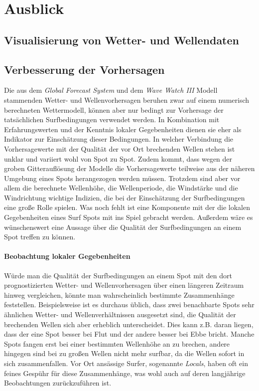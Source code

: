 \chapter{Ausblick}

\section{Visualisierung von Wetter- und Wellendaten}

\section{Verbesserung der Vorhersagen}
Die aus dem \textit{Global Forecast System} und dem \textit{Wave Watch
  III} Modell stammenden Wetter- und Wellenvorhersagen beruhen zwar
auf einem numerisch berechneten Wettermodell, können aber nur bedingt
zur Vorhersage der tatsächlichen Surfbedingungen verwendet werden. In
Kombination mit Erfahrungswerten und der Kenntnis lokaler
Gegebenheiten dienen sie eher als Indikator zur Einschätzung dieser
Bedingungen. In welcher Verbindung die Vorhersagewerte mit der
Qualität der vor Ort brechenden Wellen stehen ist unklar und variiert
wohl von Spot zu Spot. Zudem kommt, dass wegen der groben
Gitterauflösung der Modelle die Vorhersagewerte teilweise aus der
näheren Umgebung eines Spots herangezogen werden müssen. Trotzdem sind
aber vor allem die berechnete Wellenhöhe, die Wellenperiode, die
Windstärke und die Windrichtung wichtige Indizien, die bei der
Einschätzung der Surfbedingungen eine große Rolle spielen. Was noch
fehlt ist eine Komponente mit der die lokalen Gegebenheiten eines Surf
Spots mit ins Spiel gebracht werden. Außerdem wäre es wünschenswert
eine Aussage über die Qualität der Surfbedingungen an einem Spot
treffen zu können.

\subsubsection{Beobachtung lokaler Gegebenheiten}
Würde man die Qualität der Surfbedingungen an einem Spot mit den dort
prognostizierten Wetter- und Wellenvorhersagen über einen längeren
Zeitraum hinweg vergleichen, könnte man wahrscheinlich bestimmte
Zusammenhänge feststellen. Beispielsweise ist es durchaus üblich, dass
zwei benachbarte Spots sehr ähnlichen Wetter- und Wellenverhältnissen
ausgesetzt sind, die Qualität der brechenden Wellen sich aber
erheblich unterscheidet. Dies kann z.B. daran liegen, dass der eine
Spot besser bei Flut und der andere besser bei Ebbe bricht. Manche
Spots fangen erst bei einer bestimmten Wellenhöhe an zu brechen,
andere hingegen sind bei zu großen Wellen nicht mehr surfbar, da die
Wellen sofort in sich zusammenfallen. Vor Ort ansässige Surfer,
sogenannte \textit{Locals}, haben oft ein feines Gespühr für diese
Zusammenhänge, was wohl auch auf deren langjährige Beobachtungen
zurückzuführen ist. 

